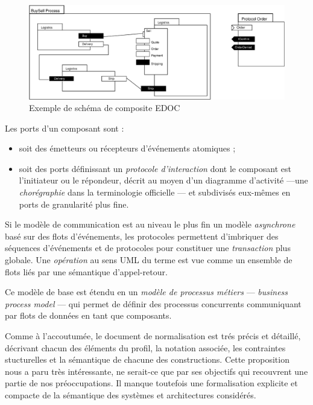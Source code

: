\begin{figure}[htbp]
    \centering
    \includegraphics[width=.9\textwidth]{figures/fig-edoc-comp-sample.eps}
    \caption{Exemple de sch\'ema de composite EDOC}
    \label{fig-edoc-comp-sample}
\end{figure}

Les ports d'un composant sont :
\begin{itemize}
  \item soit des \'emetteurs ou r\'ecepteurs d'\'ev\'enements
  atomiques ;
\item soit des ports d\'efinissant un \emph{protocole d'interaction}
  dont le composant est l'initiateur ou le r\'epondeur,
  d\'ecrit au moyen d'un diagramme d'activit\'e ---une
  \emph{chor\'egraphie} dans la terminologie officielle --- et
  subdivis\'es eux-m\^emes en ports de granularit\'e plus fine. 
\end{itemize}
Si le mod\`ele de communication est au niveau le plus fin un
mod\`ele \emph{asynchrone} bas\'e sur des flots d'\'ev\'enements,
les protocoles permettent d'imbriquer des  s\'equences
d'\'ev\'enements et de protocoles pour constituer une
\emph{transaction} plus globale. Une \emph{op\'eration} au sens UML
du terme est vue comme un ensemble de flots li\'es par une
s\'emantique d'appel-retour.

Ce mod\`ele de base est \'etendu en un \emph{mod\`ele de processus
  m\'etiers} --- \emph{business process model} --- qui permet
de d\'efinir des 
processus concurrents communiquant par flots de donn\'ees en tant que composants.

Comme \`a l'accoutum\'ee, le document de normalisation est  tr\'es
pr\'ecis et d\'etaill\'e,  d\'ecrivant chacun des \'el\'ements
du profil, la notation associ\'ee, les contraintes stucturelles et la
s\'emantique de chacune des constructions. Cette proposition nous a
paru tr\`es int\'eressante, ne serait-ce que par ses objectifs qui
recouvrent une partie de nos pr\'eoccupations. Il
manque toutefois une formalisation explicite et compacte de la
s\'emantique des syst\`emes et architectures consid\'er\'es.

